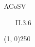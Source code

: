 \documentclass[11pt,letterpaper]{article}
\begin{document}
\newpage
\noindent
ACoSV

\begin{enumerate}
\item[II.3.6]
  
\end{enumerate}

\begin{center}
\line(1, 0){250}
\end{center}
\end{document}
